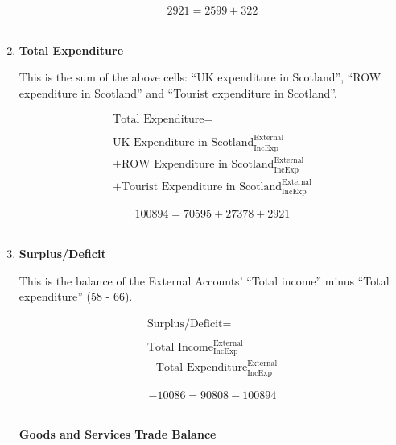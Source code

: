 \begin{enumerate}
\begin{equation} \nonumber
2921 = 2599+322
\end{equation}\\


\item \textbf {Total Expenditure}

This is the sum of the above cells: “UK expenditure in Scotland”, “ROW expenditure in Scotland” and “Tourist expenditure in Scotland”.

\begin{equation}
\begin{split}
\text{Total Expenditure} =  \\ \\
\text{UK Expenditure in Scotland}^\text{External}_\text{IncExp}\\
+\text{ROW Expenditure in Scotland}^\text{External}_\text{IncExp}\\
+\text{Tourist Expenditure in Scotland}^\text{External}_\text{IncExp}
\end{split} \label{eq:2.5.69}
\end{equation}

\begin{equation} \nonumber
100894 = 70595+27378+2921
\end{equation}\\


\item \textbf {Surplus/Deficit}

This is the balance of the External Accounts’ “Total income” minus “Total expenditure” (58 - 66).

\begin{equation}
\begin{split}
\text{Surplus/Deficit} =  \\ \\
\text{Total Income}^\text{External}_\text{IncExp}\\
-\text{Total Expenditure}^\text{External}_\text{IncExp}
\end{split} \label{eq:2.5.70}
\end{equation}

\begin{equation} \nonumber
-10086 = 90808-100894
\end{equation}\\



\pagebreak


\begin{center}
\textbf{\LARGE Goods and Services Trade Balance}
\end{center}


\end{enumerate}
